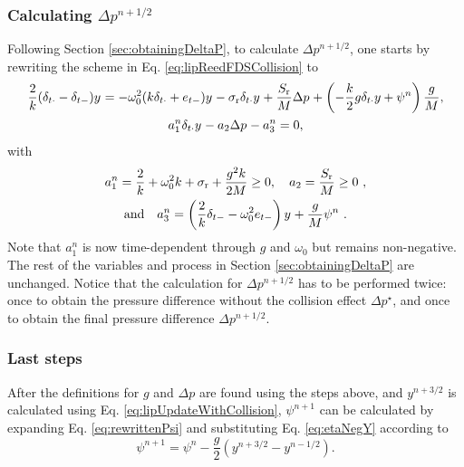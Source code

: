 \subsubsection{Calculating $\Delta p^{n+1/2}$}
Following Section \ref{sec:obtainingDeltaP}, to calculate $\Delta p^{n+1/2}$, one starts by rewriting the scheme in Eq. \eqref{eq:lipReedFDSCollision} to
\begin{gather*}
    \frac{2}{k} (\delta_{t\cdot} - \delta_{t-})y^{} = -\omega_0^2(k\delta_{t\cdot} + e_{t-})y^{} - \sigma_\text{r}\delta_{t\cdot} y^{} + \frac{S_\text{r}}{M}\Delta p^{} + \left(-\frac{k}{2}g\delta_{t\cdot}y+\psi^n\right)\frac{g}{M},\\
    a_1^n\delta_{t\cdot}y^{} - a_2\Delta p^{} - a_3^n = 0,
\end{gather*}
with 
\begin{equation*}
    \begin{gathered}
    a_1^n = \frac{2}{k} + \omega_0^2k + \sigma_\text{r} + \frac{g^2k}{2M} \geq 0, \quad a_2 = \frac{S_\text{r}}{M} \geq 0\ , \\
     \text{and} \quad a_3^n = \left(\frac{2}{k} \delta_{t-} - \omega_0^2e_{t-}\right)y^{} + \frac{g}{M}\psi^n\ .
    \end{gathered}
\end{equation*}
Note that $a_1^n$ is now time-dependent through $g$ and $\omega_0$ but remains non-negative. The rest of the variables and process in Section \ref{sec:obtainingDeltaP} are unchanged. Notice that the calculation for $\Delta p^{n+1/2}$ has to be performed twice: once to obtain the pressure difference without the collision effect $\Delta p^\star$, and once to obtain the final pressure difference $\Delta p^{n+1/2}$.

\subsubsection{Last steps}
After the definitions for $g$ and $\Delta p$ are found using the steps above, and $y^{n+3/2}$ is calculated using Eq. \eqref{eq:lipUpdateWithCollision}, $\psi^{n+1}$ can be calculated by expanding Eq. \eqref{eq:rewrittenPsi} and substituting Eq. \eqref{eq:etaNegY} according to
\begin{equation}\label{eq:psiUpdate}
    \psi^{n+1} = \psi^n - \frac{g}{2}\left(y^{n+3/2} - y^{n-1/2}\right).
\end{equation}

